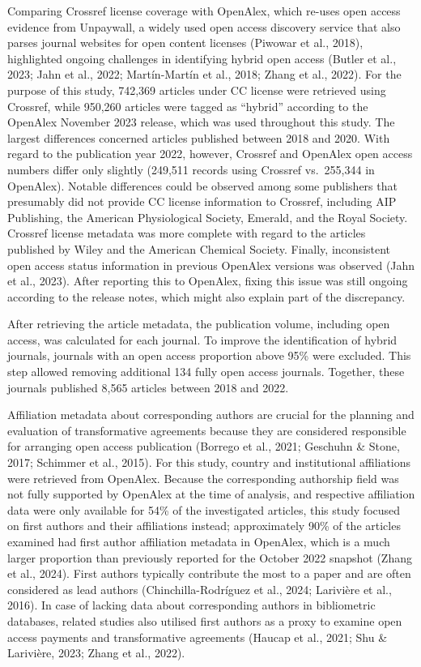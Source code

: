 \documentclass[a4paper,man,floatsintext,longtable,noextraspace,12pt]{apa6}
\begin{document}
Comparing Crossref license coverage with OpenAlex, which re-uses open
access evidence from Unpaywall, a widely used open access discovery
service that also parses journal websites for open content licenses
(Piwowar et al., 2018), highlighted ongoing challenges in identifying
hybrid open access (Butler et al., 2023; Jahn et al., 2022;
Martín-Martín et al., 2018; Zhang et al., 2022). For the purpose of this
study, 742,369 articles under CC license were retrieved using Crossref,
while 950,260 articles were tagged as ``hybrid'' according to the
OpenAlex November 2023 release, which was used throughout this study.
The largest differences concerned articles published between 2018 and
2020. With regard to the publication year 2022, however, Crossref and
OpenAlex open access numbers differ only slightly (249,511 records using
Crossref vs.~255,344 in OpenAlex). Notable differences could be observed
among some publishers that presumably did not provide CC license
information to Crossref, including AIP Publishing, the American
Physiological Society, Emerald, and the Royal Society. Crossref license
metadata was more complete with regard to the articles published by
Wiley and the American Chemical Society. Finally, inconsistent open
access status information in previous OpenAlex versions was observed
(Jahn et al., 2023). After reporting this to OpenAlex, fixing this issue
was still ongoing according to the release notes, which might also
explain part of the discrepancy.

After retrieving the article metadata, the publication volume, including
open access, was calculated for each journal. To improve the
identification of hybrid journals, journals with an open access
proportion above 95\% were excluded. This step allowed removing
additional 134 fully open access journals. Together, these journals
published 8,565 articles between 2018 and 2022.

Affiliation metadata about corresponding authors are crucial for the
planning and evaluation of transformative agreements because they are
considered responsible for arranging open access publication (Borrego et
al., 2021; Geschuhn \& Stone, 2017; Schimmer et al., 2015). For this
study, country and institutional affiliations were retrieved from
OpenAlex. Because the corresponding authorship field was not fully
supported by OpenAlex at the time of analysis, and respective
affiliation data were only available for 54\% of the investigated
articles, this study focused on first authors and their affiliations
instead; approximately 90\% of the articles examined had first author
affiliation metadata in OpenAlex, which is a much larger proportion than
previously reported for the October 2022 snapshot (Zhang et al., 2024).
First authors typically contribute the most to a paper and are often
considered as lead authors (Chinchilla-Rodríguez et al., 2024; Larivière
et al., 2016). In case of lacking data about corresponding authors in
bibliometric databases, related studies also utilised first authors as a
proxy to examine open access payments and transformative agreements
(Haucap et al., 2021; Shu \& Larivière, 2023; Zhang et al., 2022).
\end{document}
